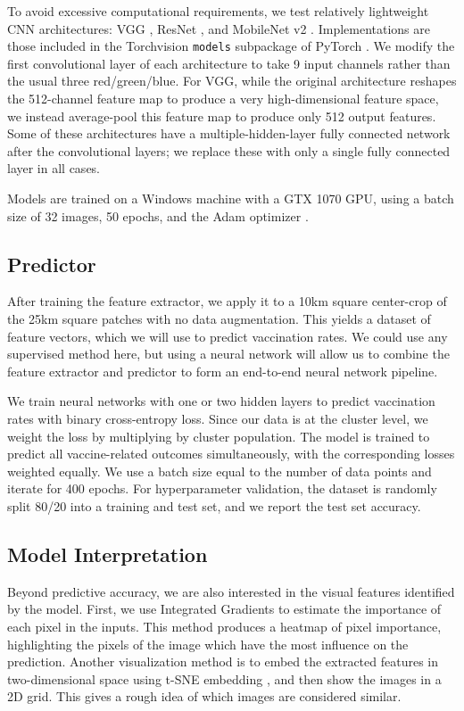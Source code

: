\documentclass[]{article}
\begin{document}
To avoid excessive computational requirements, we test relatively lightweight CNN architectures: VGG \cite{simonyan2014deep}, ResNet \cite{he2015deep}, and MobileNet v2 \cite{Sandler_2018}. Implementations are those included in the Torchvision \texttt{models} subpackage of PyTorch \cite{paszke2017automatic}. We modify the first convolutional layer of each architecture to take 9 input channels rather than the usual three red/green/blue. For VGG, while the original architecture reshapes the 512-channel feature map to produce a very high-dimensional feature space, we instead average-pool this feature map to produce only 512 output features. Some of these architectures have a multiple-hidden-layer fully connected network after the convolutional layers; we replace these with only a single fully connected layer in all cases.

Models are trained on a Windows machine with a GTX 1070 GPU, using a batch size of 32 images, 50 epochs, and the Adam optimizer \cite{kingma2014adam}.

\subsection{Predictor}
After training the feature extractor, we apply it to a 10km square center-crop of the 25km square patches with no data augmentation. This yields a dataset of feature vectors, which we will use to predict vaccination rates. We could use any supervised method here, but using a neural network will allow us to combine the feature extractor and predictor to form an end-to-end neural network pipeline.

We train neural networks with one or two hidden layers to predict vaccination rates with binary cross-entropy loss. Since our data is at the cluster level, we weight the loss by multiplying by cluster population. The model is trained to predict all vaccine-related outcomes simultaneously, with the corresponding losses weighted equally. We use a batch size equal to the number of data points and iterate for 400 epochs. For hyperparameter validation, the dataset is randomly split 80/20 into a training and test set, and we report the test set accuracy.

\subsection{Model Interpretation}
Beyond predictive accuracy, we are also interested in the visual features identified by the model. First, we use Integrated Gradients \cite{sundararajan2017} to estimate the importance of each pixel in the inputs. This method produces a heatmap of pixel importance, highlighting the pixels of the image which have the most influence on the prediction. Another visualization method is to embed the extracted features in two-dimensional space using t-SNE embedding \cite{vanDerMaaten2008}, and then show the images in a 2D grid. This gives a rough idea of which images are considered similar.
\end{document}
